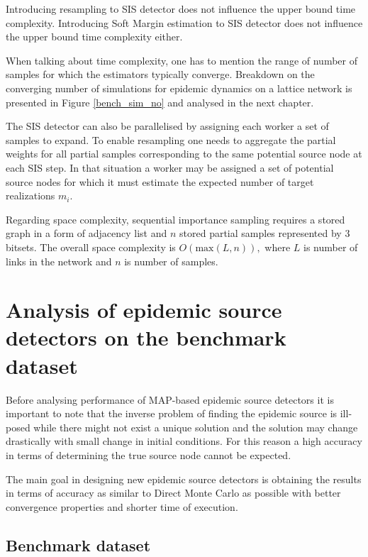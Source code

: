 \documentclass[times, utf8, diplomski]{fer}
\begin{document}
Introducing resampling to SIS detector does not influence the upper bound time complexity. 
Introducing Soft Margin estimation to SIS detector does not influence the upper bound time complexity either.

When talking about time complexity, one has to mention the range of number of samples for which the estimators typically converge. Breakdown on the converging number of simulations for epidemic dynamics  on  a lattice network is presented in Figure \ref{bench_sim_no} and analysed in the next chapter. 

The SIS detector can also be parallelised by assigning each worker a set of samples to expand. To enable resampling one needs to aggregate the partial weights for all partial samples corresponding to the same potential source node at each SIS step. In that situation a worker may be assigned a set of potential source nodes for which it must estimate the expected number of target realizations $m_i$. 

Regarding space complexity, sequential importance sampling requires a stored graph in a form of adjacency list and $n$ stored partial samples represented by $3$ bitsets. The  overall space complexity is $O(\text{max}(L, n)),$ where $L$ is number of links in the network and $n$ is number of samples.
 
\chapter{Analysis of epidemic source detectors on the benchmark dataset}
\label{Bench}

Before analysing performance of MAP-based epidemic source detectors it is important to note that the inverse problem of finding the epidemic source is ill-posed \cite{Parker:1994:MDS:174769} while there might not exist a unique solution and the solution may change drastically with  small change in  initial conditions. For this reason a high accuracy in terms of determining the true source node  cannot be expected.

 The main goal in designing new epidemic source detectors is obtaining the results in terms of accuracy as similar to Direct Monte Carlo as possible with better convergence properties and shorter time of execution. 

\section{Benchmark dataset}
\end{document}
